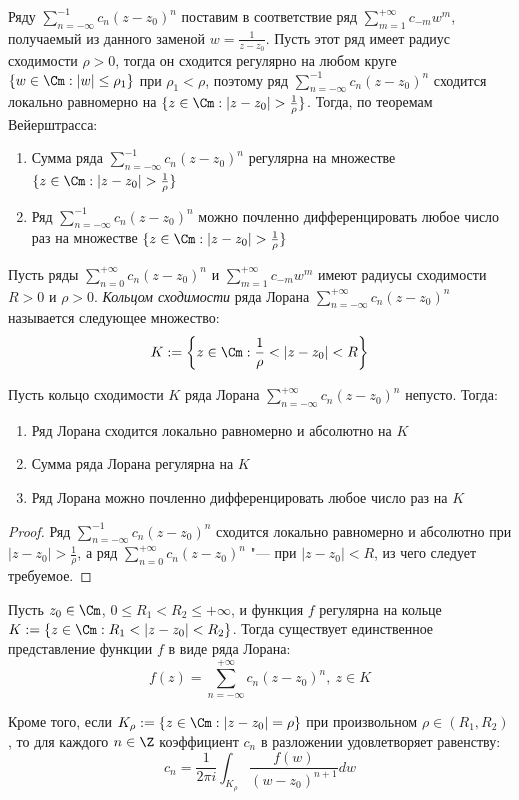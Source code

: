 \begin{note}
	Ряду $\sum_{n = -\infty}^{-1}c_n(z - z_0)^n$ поставим в соответствие ряд $\sum_{m = 1}^{+\infty}c_{-m}w^m$, получаемый из данного заменой $w = \frac1{z - z_0}$. Пусть этот ряд имеет радиус сходимости $\rho > 0$, тогда он сходится регулярно на любом круге $\{w \in \Cm: |w| \le \rho_1\}$ при $\rho_1 < \rho$, поэтому ряд $\sum_{n = -\infty}^{-1}c_n(z - z_0)^n$ сходится локально равномерно на $\{z \in \Cm: |z - z_0| > \frac1\rho\}$. Тогда, по теоремам Вейерштрасса:
	\begin{enumerate}
		\item Сумма ряда $\sum_{n = -\infty}^{-1}c_n(z - z_0)^n$ регулярна на множестве $\{z \in \Cm: |z - z_0| > \frac1\rho\}$
		\item Ряд $\sum_{n = -\infty}^{-1}c_n(z - z_0)^n$ можно почленно дифференцировать любое число раз на множестве $\{z \in \Cm: |z - z_0| > \frac1\rho\}$
	\end{enumerate}
\end{note}

\begin{definition}
	Пусть ряды $\sum_{n = 0}^{+\infty}c_n(z - z_0)^n$ и $\sum_{m = 1}^{+\infty}c_{-m}w^m$ имеют радиусы сходимости $R > 0$ и $\rho > 0$. \textit{Кольцом сходимости} ряда Лорана $\sum_{n = -\infty}^{+\infty}c_n(z - z_0)^n$ называется следующее множество:
	\[K := \left\{z \in \Cm: \frac1\rho < |z - z_0| < R\right\}\]
\end{definition}

\begin{proposition}
	Пусть кольцо сходимости $K$ ряда Лорана $\sum_{n = -\infty}^{+\infty}c_n(z - z_0)^n$ непусто. Тогда:
	\begin{enumerate}
		\item Ряд Лорана сходится локально равномерно и абсолютно на $K$
		\item Сумма ряда Лорана регулярна на $K$
		\item Ряд Лорана можно почленно дифференцировать любое число раз на $K$
	\end{enumerate}
\end{proposition}

\begin{proof}
	Ряд $\sum_{n = -\infty}^{-1}c_n(z - z_0)^n$ сходится локально равномерно и абсолютно при $|z - z_0| > \frac{1}\rho$, а ряд $\sum_{n = 0}^{+\infty}c_n(z - z_0)^n$ "--- при $|z - z_0| < R$, из чего следует требуемое.
\end{proof}

\begin{theorem}
	Пусть $z_0 \in \Cm$, $0 \le R_1 < R_2 \le +\infty$, и функция $f$ регулярна на кольце $K := \{z \in \Cm: R_1 < |z - z_0| < R_2\}$. Тогда существует единственное представление функции $f$ в виде ряда Лорана:
	\[f(z) = \sum_{n = -\infty}^{+\infty}c_n(z - z_0)^n,~z \in K\]
	
	Кроме того, если $K_\rho := \{z \in \Cm: |z - z_0| = \rho\}$ при произвольном $\rho \in (R_1, R_2)$, то для каждого $n \in \Z$ коэффициент $c_n$ в разложении удовлетворяет равенству: \pagebreak
	\[c_n = \frac1{2\pi i}\int_{K_{\rho}} \frac{f(w)}{(w - z_0)^{n+1}}dw\]
\end{theorem}

